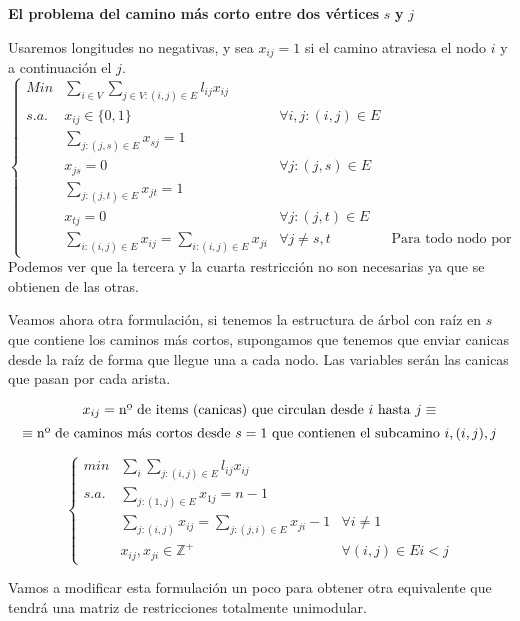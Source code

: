 \documentclass[openany]{book}
\begin{document}
\begin{exercise}
    {\color{turquoise} \textbf{El problema del camino más corto entre dos vértices} $ s $ \textbf{ y } $ j $} 

    Usaremos longitudes no negativas, y sea $ x_{ij} = 1  $ si el camino atraviesa el nodo $ i $ y a continuación el $ j $.
    $$ \left\{
    \begin{array}{llrr}
        Min & \sum\limits_{i \in V}^{}\sum\limits_{j \in V: (i,j) \in E}^{} l_{ij}x_{ij}\\
        s.a. & x_{ij} \in \{0,1\} & \forall i,j: (i,j) \in E\\
        & \sum\limits_{j:(j,s) \in E}^{}x_{sj} = 1 \\
        & x_{js} = 0 & \forall j : (j,s) \in E\\
        & \sum\limits_{j:(j,t) \in E}^{} x_{jt} = 1\\
        & x_{tj} = 0 & \forall j : (j,t) \in E\\
        & \sum\limits_{i:(i,j) \in E}^{} x_{ij} = \sum\limits_{i:(i,j) \in E}^{} x_{ji} & \forall j \ne s,t & \text{Para todo nodo por el que entres, sales}
    \end{array}
    \right. $$
    Podemos ver que la tercera y la cuarta restricción no son necesarias ya que se obtienen de las otras.

    Veamos ahora otra formulación, si tenemos la estructura de árbol con raíz en $ s $ que contiene los caminos más cortos, supongamos que tenemos que enviar canicas desde la raíz de forma que llegue una a cada nodo. Las variables serán las canicas que pasan por cada arista.

    $$ x_{ij} = \text{nº de items (canicas) que circulan desde $ i $ hasta $ j $} \equiv $$$$ \equiv\text{nº de caminos más cortos desde $ s = 1 $ que contienen el subcamino $ i,(i,j),j $}$$


    $$ \left\{
    \begin{array}{llr}
        min & \sum\limits_{i}^{} \sum\limits_{j:(i,j)\in E}^{} l_{ij}x_{ij}\\
        s.a. & \sum\limits_{j:(1,j) \in E}^{} x_{1j} = n-1 \\
        & \sum\limits_{j: (i,j)}^{} x_{ij} = \sum\limits_{j:(j,i) \in E}^{} x_{ji}-1 & \forall i \ne 1\\
        & x_{ij},x_{ji} \in \mathbb{Z} ^{+} & \forall (i,j) \in E i<j
    \end{array}
    \right. $$

    Vamos a modificar esta formulación un poco para obtener otra equivalente que tendrá una matriz de restricciones totalmente unimodular.


\end{exercise}
\end{document}
